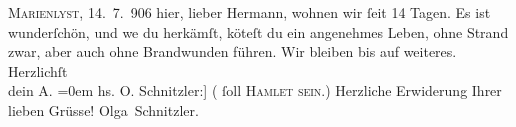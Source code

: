 \begin{ledgroupsized}[t]{13cm}
           \textsc{{\pb}Marienlyst}, 14. 7. 906\pend
           \pstart
           hier, lieber Hermann, wohnen wir ſeit 14 Tagen. Es ist wunderſchön,
               und we{\geminationn} du herkämſt, kö{\geminationn}teſt du ein angenehmes Leben, ohne Strand zwar, aber auch ohne Brandwunden führen.
               Wir bleiben bis auf weiteres.\pend
           \pstart
           Herzlichſt{\\[\baselineskip]}dein \spacefill\mbox{A.}\pend
           \leftskip=0em{}\pstart
           \noindent{}{\pb}{[}hs. O. Schnitzler:{]} (\label{T_L01612_1v}\label{T_L01612_1h} ſoll \textsc{Hamlet sein.})\pend
           \pstart Herzliche Erwiderung Ihrer lieben Grüsse!
               { }\spacefill\mbox{Olga Schnitzler.}\pend{}\endnumbering{}\end{ledgroupsized}  \newcommand{\dateiname}{L01612}\newcommand{\titel}{Arthur und Olga Schnitzler an Hermann Bahr, 14. 7. 1906}\newcommand{\editorInnen}{ Kurt Ifkovits,  Martin Anton Müller}
      